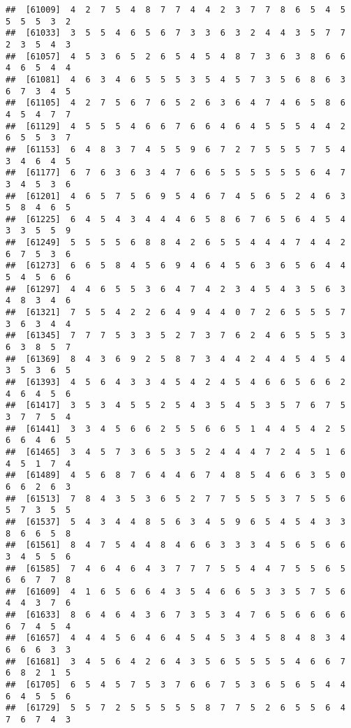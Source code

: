 \documentclass[
]{book}
\begin{document}
\begin{verbatim}
##  [61009]  4  2  7  5  4  8  7  7  4  4  2  3  7  7  8  6  5  4  5  5  5  5  3  2
##  [61033]  3  5  5  4  6  5  6  7  3  3  6  3  2  4  4  3  5  7  7  2  3  5  4  3
##  [61057]  4  5  3  6  5  2  6  5  4  5  4  8  7  3  6  3  8  6  6  4  6  5  4  4
##  [61081]  4  6  3  4  6  5  5  5  3  5  4  5  7  3  5  6  8  6  3  6  7  3  4  5
##  [61105]  4  2  7  5  6  7  6  5  2  6  3  6  4  7  4  6  5  8  6  4  5  4  7  7
##  [61129]  4  5  5  5  4  6  6  7  6  6  4  6  4  5  5  5  4  4  2  6  5  5  3  7
##  [61153]  6  4  8  3  7  4  5  5  9  6  7  2  7  5  5  5  7  5  4  3  4  6  4  5
##  [61177]  6  7  6  3  6  3  4  7  6  6  5  5  5  5  5  5  6  4  7  3  4  5  3  6
##  [61201]  4  6  5  7  5  6  9  5  4  6  7  4  5  6  5  2  4  6  3  5  8  4  6  5
##  [61225]  6  4  5  4  3  4  4  4  6  5  8  6  7  6  5  6  4  5  4  3  3  5  5  9
##  [61249]  5  5  5  5  6  8  8  4  2  6  5  5  4  4  4  7  4  4  2  6  7  5  3  6
##  [61273]  6  6  5  8  4  5  6  9  4  6  4  5  6  3  6  5  6  4  4  5  4  5  6  6
##  [61297]  4  4  6  5  5  3  6  4  7  4  2  3  4  5  4  3  5  6  3  4  8  3  4  6
##  [61321]  7  5  5  4  2  2  6  4  9  4  4  0  7  2  6  5  5  5  7  3  6  3  4  4
##  [61345]  7  7  7  5  3  3  5  2  7  3  7  6  2  4  6  5  5  5  3  6  3  8  5  7
##  [61369]  8  4  3  6  9  2  5  8  7  3  4  4  2  4  4  5  4  5  4  3  5  3  6  5
##  [61393]  4  5  6  4  3  3  4  5  4  2  4  5  4  6  6  5  6  6  2  4  6  4  5  6
##  [61417]  3  5  3  4  5  5  2  5  4  3  5  4  5  3  5  7  6  7  5  3  7  7  5  4
##  [61441]  3  3  4  5  6  6  2  5  5  6  6  5  1  4  4  5  4  2  5  6  6  4  6  5
##  [61465]  3  4  5  7  3  6  5  3  5  2  4  4  4  7  2  4  5  1  6  4  5  1  7  4
##  [61489]  4  5  6  8  7  6  4  4  6  7  4  8  5  4  6  6  3  5  0  6  6  2  6  3
##  [61513]  7  8  4  3  5  3  6  5  2  7  7  5  5  5  3  7  5  5  6  5  7  3  5  5
##  [61537]  5  4  3  4  4  8  5  6  3  4  5  9  6  5  4  5  4  3  3  8  6  6  5  8
##  [61561]  8  4  7  5  4  4  8  4  6  6  3  3  3  4  5  6  5  6  6  3  4  5  5  6
##  [61585]  7  4  6  4  6  4  3  7  7  7  5  5  4  4  7  5  5  6  5  6  6  7  7  8
##  [61609]  4  1  6  5  6  6  4  3  5  4  6  6  5  3  3  5  7  5  6  4  4  3  7  6
##  [61633]  8  6  4  6  4  3  6  7  3  5  3  4  7  6  5  6  6  6  6  6  7  4  5  4
##  [61657]  4  4  4  5  6  4  6  4  5  4  5  3  4  5  8  4  8  3  4  6  6  6  3  3
##  [61681]  3  4  5  6  4  2  6  4  3  5  6  5  5  5  5  4  6  6  7  6  8  2  1  5
##  [61705]  6  5  4  5  7  5  3  7  6  6  7  5  3  6  5  6  5  4  4  6  4  5  5  6
##  [61729]  5  5  7  2  5  5  5  5  5  8  7  7  5  2  6  5  5  6  4  7  6  7  4  3

\end{verbatim}
\end{document}
